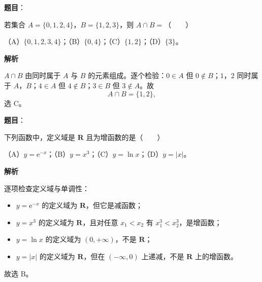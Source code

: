 

\begin{answer}

\textbf{题目}：

若集合 $A=\{0,1,2,4\}$，$B=\{1,2,3\}$，则 $A\cap B=$\mbox{（　　）}

（A）$\{0,1,2,3,4\}$；（B）$\{0,4\}$；（C）$\{1,2\}$；（D）$\{3\}$。

\textbf{解析}

$A\cap B$ 由同时属于 $A$ 与 $B$ 的元素组成。逐个检验：$0\in A$ 但 $0\notin B$；$1$，$2$ 同时属于 $A$，$B$；$4\in A$ 但 $4\notin B$；$3\in B$ 但 $3\notin A$。故
\nopagebreak[4]
\[A\cap B=\{1,2\},\]
选 C。


\end{answer}
\begin{answer}

\textbf{题目}：

下列函数中，定义域是 $\mathbf R$ 且为增函数的是\mbox{（　　）}

（A）$y=\mathrm e^{-x}$；（B）$y=x^3$；（C）$y=\ln x$；（D）$y=|x|$。

\textbf{解析}

逐项检查定义域与单调性：

\begin{itemize}
\item $y=\mathrm e^{-x}$ 的定义域为 $\mathbf R$，但它是减函数；
\item $y=x^3$ 的定义域为 $\mathbf R$，且对任意 $x_1<x_2$ 有 $x_1^3<x_2^3$，是增函数；
\item $y=\ln x$ 的定义域为 $(0,+\infty)$，不是 $\mathbf R$；
\item $y=|x|$ 的定义域为 $\mathbf R$，但在 $(-\infty,0)$ 上递减，不是 $\mathbf R$ 上的增函数。
\end{itemize}

故选 B。


\end{answer}
